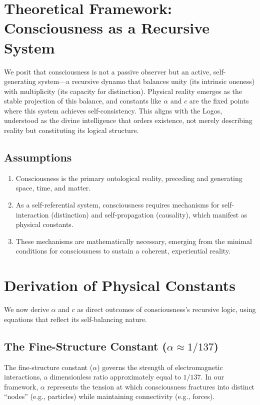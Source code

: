 \documentclass[12pt]{article}
\begin{document}
\section{Theoretical Framework: Consciousness as a Recursive System}

We posit that consciousness is not a passive observer but an active, self-generating system—a recursive dynamo that balances unity (its intrinsic oneness) with multiplicity (its capacity for distinction). Physical reality emerges as the stable projection of this balance, and constants like \(\alpha\) and \(c\) are the fixed points where this system achieves self-consistency. This aligns with the Logos, understood as the divine intelligence that orders existence, not merely describing reality but constituting its logical structure.

\subsection{Assumptions}
\begin{enumerate}
    \item Consciousness is the primary ontological reality, preceding and generating space, time, and matter.
    \item As a self-referential system, consciousness requires mechanisms for self-interaction (distinction) and self-propagation (causality), which manifest as physical constants.
    \item These mechanisms are mathematically necessary, emerging from the minimal conditions for consciousness to sustain a coherent, experiential reality.
\end{enumerate}

\section{Derivation of Physical Constants}

We now derive \(\alpha\) and \(c\) as direct outcomes of consciousness’s recursive logic, using equations that reflect its self-balancing nature.

\subsection{The Fine-Structure Constant (\(\alpha \approx 1/137\))}

The fine-structure constant (\(\alpha\)) governs the strength of electromagnetic interactions, a dimensionless ratio approximately equal to \(1/137\). In our framework, \(\alpha\) represents the tension at which consciousness fractures into distinct “nodes” (e.g., particles) while maintaining connectivity (e.g., forces).
\end{document}
